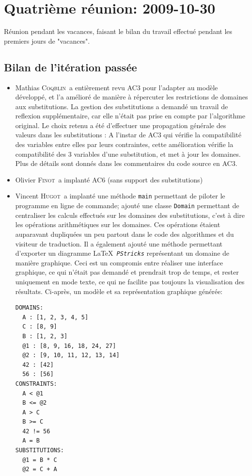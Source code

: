 \documentclass[a4paper,12pt]{article}
\def\tech{\texttt}
\def\familyname{\textsc}
\def\firstname#1{#1}
\def\groupmember#1#2{\firstname{#1} \familyname{#2}}
\def\mmat{\groupmember{Mathias}{Coqblin}}
\def\moli{\groupmember{Olivier}{Finot}}
\def\mvin{\groupmember{Vincent}{Hugot}}
\begin{document}
\section{Quatrième réunion: 2009-10-30}

Réunion pendant les vacances, faisant le bilan du travail
effectué pendant les premiers jours de "vacances".

\subsection{Bilan de l'itération passée}

\begin{itemize}
 \item \mmat\ a entièrement revu AC3 pour l'adapter au modèle développé, et l'a amélioré de manière à répercuter les restrictions de domaines aux substitutions.
 La gestion des substitutions a demandé un travail de reflexion supplémentaire, car elle
 n'était pas prise en compte par l'algorithme original.
 Le choix retenu a été d'effectuer une propagation générale des valeurs dans les substitutions :
 A l'instar de AC3 qui vérifie la compatibilité des variables entre elles par leurs contraintes,
 cette amélioration vérifie la compatibilité des 3 variables d'une substitution, et met à jour les domaines.
 Plus de détails sont donnés dans les commentaires du code source en AC3.
\item \moli\ a implanté AC6 (sans support des substitutions)
\item \mvin\ a implanté une méthode \texttt{main} permettant de piloter le programme
  en ligne de commande; ajouté une classe \tech{Domain} permettant
  de centraliser les calculs effectués sur les domaines des substitutions,
  c'est à dire les opérations arithmétiques sur les domaines. 
  Ces opérations étaient auparavant dupliquées un peu partout dans le
  code des algorithmes et du visiteur de traduction.
  Il a également ajouté une méthode permettant d'exporter 
  un diagramme \LaTeX\ \texttt{\emph{PStricks}} représentant un domaine
  de manière graphique. Ceci est un compromis entre réaliser
  une interface graphique, ce qui n'était pas demandé et
  prendrait trop de temps, et rester uniquement en mode texte,
  ce qui ne facilite pas toujours la visualisation des résultats.
  Ci-après, un modèle et sa représentation graphique générée:

\newpage

  \begin{verbatim}
DOMAINS:
  A : [1, 2, 3, 4, 5]
  C : [8, 9]
  B : [1, 2, 3]
  @1 : [8, 9, 16, 18, 24, 27]
  @2 : [9, 10, 11, 12, 13, 14]
  42 : [42]
  56 : [56]
CONSTRAINTS:
  A < @1
  B <= @2
  A > C
  B >= C
  42 != 56
  A = B
SUBSTITUTIONS:
  @1 = B * C
  @2 = C + A
  \end{verbatim}



\end{itemize}
\end{document}
